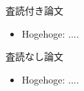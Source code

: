 \documentclass[12pt,dvipdfmx]{jreport}
\begin{document}
\begin{list}%
 {} %
 {} %
 \item 査読付き論文
       \begin{itemize}
	\item Hogehoge: ....
       \end{itemize}
 \item 査読なし論文
       \begin{itemize}
	\item Hogehoge: ....
       \end{itemize}
\end{list}

\newpage

%
\end{document}
